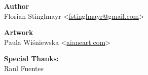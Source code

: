 \onecolumn


\vspace*{\fill}

\begin{center}
  \textbf{Author}\\
  Florian Stinglmayr
  <\href{mailto:fstinglmayr@gmail.com}{fstinglmayr@gmail.com}>

  \textbf{Artwork}\\
  Paula Wiśniewska
  <\href{http://aianeart.com}{aianeart.com}>

  \textbf{Special Thanks:}\\
  Raul Fuentes
\end{center}

\twocolumn
\newpage
